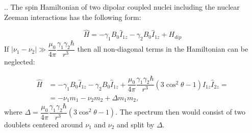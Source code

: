 \documentclass{beamer}
\begin{document}
\begin{frame}{\thesection.\thesubsection. \insertsubsection}
	The spin Hamiltonian of two dipolar coupled nuclei including the nuclear Zeeman interactions has the following form:
	
	\begin{equation}
	  \hat{H} = -\gamma_1 B_0 \hat{I}_{1z} -\gamma_2 B_0 \hat{I}_{1z}  + H_{dip} 
	\end{equation}
	If  $\mid \nu_1 -\nu_2 \mid \gg \dfrac{\mu_0}{4 \pi} \dfrac{\gamma_1 \gamma_2 \hbar}{r^3}$ then all non-diagonal terms in the Hamiltonian can be neglected:
	
	\begin{align}
	\hat{H} &= -\gamma_1 B_0 \hat{I}_{1z} -\gamma_2 B_0 \hat{I}_{1z}  + \dfrac{\mu_0}{4 \pi} \dfrac{\gamma_1 \gamma_2 \hbar}{r^3} (3 \cos^2 \theta -1)  \hat{I}_{1z} \hat{I}_{2z} =  \\
	&= -\nu_1 m_1 - \nu_2 m_2 + \Delta m_1 m_2,
	\end{align}
	where $\Delta = \dfrac{\mu_0}{4 \pi} \dfrac{\gamma_1 \gamma_2 \hbar}{r^3} (3 \cos^2 \theta -1)$.
	The spectrum then would consist of two doublets centered around $\nu_1$ and $\nu_2$ and split by $\Delta$.
	
	
	
	

    
\end{frame}
\end{document}
